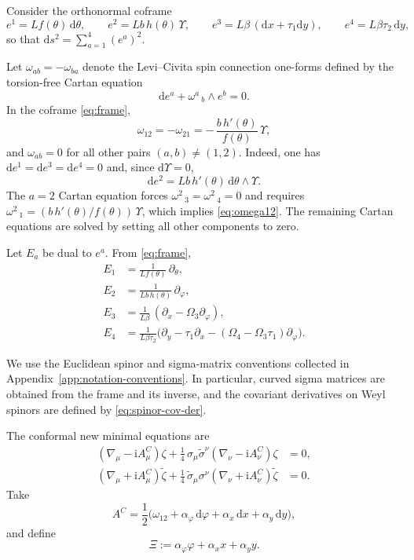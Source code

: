 \documentclass[11pt,a4paper]{article}
\numberwithin{equation}{section}
\theoremstyle{plain}
\theoremstyle{definition}
\theoremstyle{remark}
\newcommand{\ii}{\mathrm{i}}
\newcommand{\dd}{\mathrm{d}}
\newcommand{\nn}{\nonumber}
\begin{document}
Consider the orthonormal coframe
\begin{equation}
e^1 = L f(\theta)\,\dd\theta,\qquad
e^2 = L b\,h(\theta)\,\Upsilon,\qquad
e^3 = L\beta\,(\dd x+\tau_1 \dd y),\qquad
e^4 = L\beta\tau_2\,\dd y,
\label{eq:frame}
\end{equation}
so that $\dd s^2=\sum_{a=1}^4 (e^a)^2$.


Let $\omega_{ab}=-\omega_{ba}$ denote the Levi--Civita spin connection one-forms defined by the torsion-free Cartan equation
\begin{equation}
\dd e^a + {\omega^a}_{\ b}\wedge e^b = 0.
\label{eq:cartan}
\end{equation}
In the coframe \eqref{eq:frame},
\begin{equation}
\omega_{12}=-\omega_{21} = -\,\frac{b\,h'(\theta)}{f(\theta)}\,\Upsilon,
\label{eq:omega12}
\end{equation}
and $\omega_{ab}=0$ for all other pairs $(a,b)\neq(1,2)$. Indeed, one has $\dd e^1=\dd e^3=\dd e^4=0$ and, since $\dd\Upsilon=0$,
\[
\dd e^2
= L b\,h'(\theta)\,\dd\theta\wedge\Upsilon.
\]
The $a=2$ Cartan equation forces ${\omega^2}_{\ 3}={\omega^2}_{\ 4}=0$ and requires
${\omega^2}_{\ 1}=(b\,h'(\theta)/f(\theta))\,\Upsilon$, which implies \eqref{eq:omega12}.
The remaining Cartan equations are solved by setting all other components to zero.


Let $E_a$ be dual to $e^a$. From \eqref{eq:frame},
\begin{align}
E_1 &= \frac{1}{L f(\theta)}\,\partial_\theta, \nn\\
E_2 &= \frac{1}{L b\,h(\theta)}\,\partial_\varphi, \nn\\
E_3 &= \frac{1}{L\beta}\,(\partial_x-\Omega_3\partial_\varphi), \nn\\
E_4 &= \frac{1}{L\beta\tau_2}\Big(\partial_y-\tau_1\partial_x-(\Omega_4-\Omega_3\tau_1)\partial_\varphi\Big).
\label{eq:dual-frame}
\end{align}


We use the Euclidean spinor and sigma-matrix conventions collected in Appendix~\ref{app:notation-conventions}.  In particular, curved sigma matrices are obtained from the frame and its inverse, and the covariant derivatives on Weyl spinors are defined by \eqref{eq:spinor-cov-der}.


The conformal new minimal equations are~\cite{Sohnius:1981tp,Festuccia:2011ws,Dumitrescu:2012ha}
\begin{align}
(\nabla_\mu-\ii A_\mu^C)\zeta+\frac14\,\sigma_\mu\widetilde\sigma^\nu(\nabla_\nu-\ii A_\nu^C)\zeta&=0,
\label{eq:CKSE1}\\
(\nabla_\mu+\ii A_\mu^C)\widetilde\zeta+\frac14\,\widetilde\sigma_\mu\sigma^\nu(\nabla_\nu+\ii A_\nu^C)\widetilde\zeta&=0.
\label{eq:CKSE2}
\end{align}
Take
\begin{equation}
A^C=\frac12\Big(\omega_{12}+\alpha_\varphi\,\dd\varphi+\alpha_x\,\dd x+\alpha_y\,\dd y\Big),
\label{eq:AC}
\end{equation}
and define
\begin{equation}
\Xi := \alpha_\varphi \varphi+\alpha_x x+\alpha_y y .
\label{eq:spinor-phase}
\end{equation}
\end{document}
